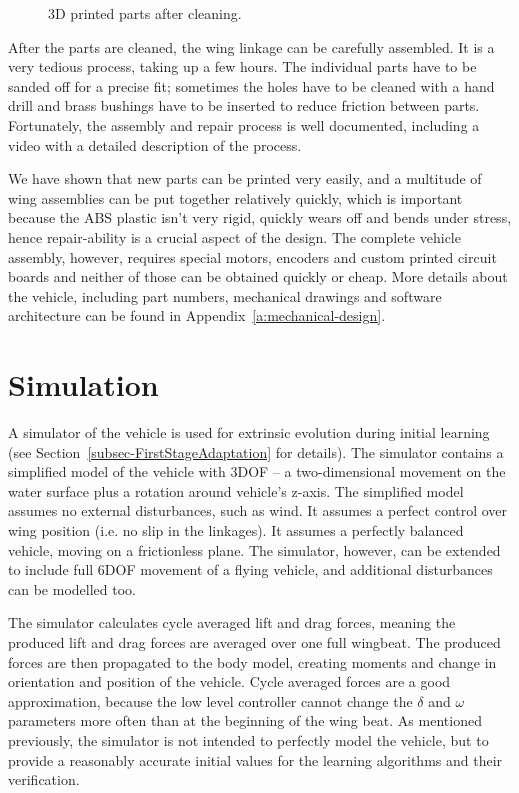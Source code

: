 \begin{figure}
\caption[3D printed parts after cleaning]{3D printed parts after cleaning.\newline \newline}
\label{fig-3d-cleaned}
\endminipage\hfill
\end{figure}

After the parts are cleaned, the wing linkage can be carefully assembled. It is a very tedious process, taking up a few hours. The individual parts have to be sanded off for a precise fit; sometimes the holes have to be cleaned with a hand drill and brass bushings have to be inserted to reduce friction between parts. Fortunately, the assembly and repair process is well documented, including a video with a detailed description of the process. 

We have shown that new parts can be printed very easily, and a multitude of wing assemblies can be put together relatively quickly, which is important because the ABS plastic isn't very rigid, quickly wears off and bends under stress, hence repair-ability is a crucial aspect of the design. The complete vehicle assembly, however, requires special motors, encoders and custom printed circuit boards and neither of those can be obtained quickly or cheap. More details about the vehicle, including part numbers, mechanical drawings and software architecture can be found in Appendix~\ref{a:mechanical-design}.


\section{Simulation}
\label{sec-sim}
A simulator of the vehicle is used for extrinsic evolution during initial learning (see Section~\ref{subsec-FirstStageAdaptation} for details). The simulator contains a simplified model of the vehicle with 3DOF -- a two-dimensional movement on the water surface plus a rotation around vehicle's z-axis. The simplified model assumes no external disturbances, such as wind. It assumes a perfect control over wing position (i.e. no slip in the linkages). It assumes a perfectly balanced vehicle, moving on a frictionless plane. The simulator, however, can be extended to include full 6DOF movement of a flying vehicle, and additional disturbances can be modelled too.

The simulator calculates cycle averaged lift and drag forces, meaning the produced lift and drag forces are averaged over one full wingbeat. The produced forces are then propagated to the body model, creating moments and change in orientation and position of the vehicle. Cycle averaged forces are a good approximation, because the low level controller cannot change the $\delta$ and $\omega$ parameters more often than at the beginning of the wing beat. As mentioned previously, the simulator is not intended to perfectly model the vehicle, but to provide a reasonably accurate initial values for the learning algorithms and their verification. 

